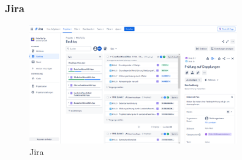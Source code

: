 \begin{frame}
\frametitle{Jira}

\begin{figure}
  \includegraphics[width=0.8\textwidth]{figures/Jira.png}
  \caption{Jira}
  \label{fig:jira}
\end{figure}

\end{frame}




